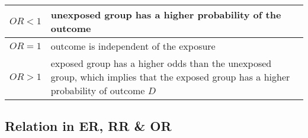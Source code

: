 \begin{customArrayStretch}{1.2}
    \begin{table}[H]
        \centering
        \begin{tabular}{|c|p{14cm}|}
            \hline
    
            $OR < 1$ & unexposed group has a higher probability of the outcome
            \cite{statistics/book/Statistics-for-Data-Scientists/Maurits-Kaptein} \\
            \hline
            
            $OR = 1$ & outcome is independent of the exposure
            \cite{statistics/book/Statistics-for-Data-Scientists/Maurits-Kaptein} \\
            \hline
            
            $OR > 1$ & exposed group has a higher odds than the unexposed group, which implies that the exposed group has a higher probability of outcome $D$
            \cite{statistics/book/Statistics-for-Data-Scientists/Maurits-Kaptein} \\
            \hline
        \end{tabular}
    \end{table}
\end{customArrayStretch}



\subsection{Relation in ER, RR \& OR}

